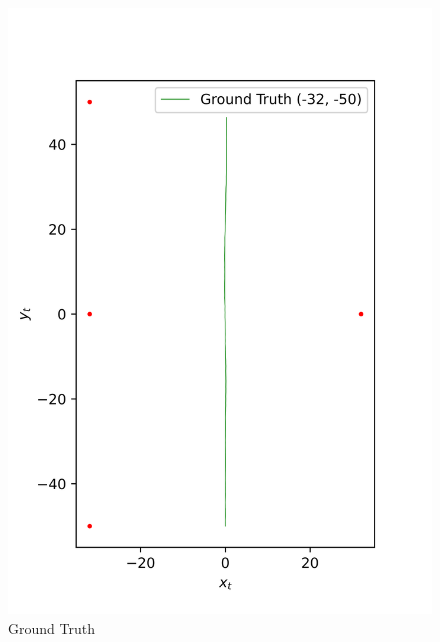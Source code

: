 \begin{figure}[H]
    \centering
    \begin{minipage}{0.49\linewidth}
        \centering
        \includegraphics[width=\linewidth]{plots/part2-f-1-GT.png}
        \caption*{Ground Truth}
    \end{minipage}
    \hfill
    \begin{minipage}{0.49\linewidth}
        \centering

\end{minipage}
\end{figure}
